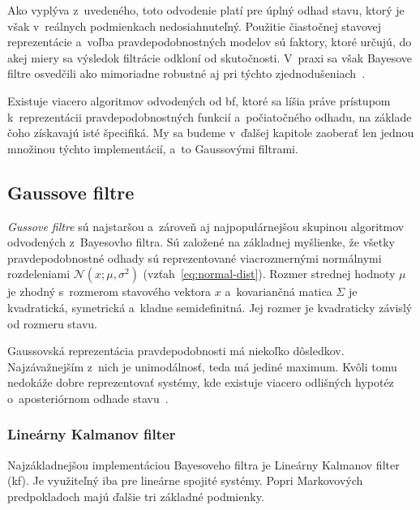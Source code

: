     Ako vyplýva z~uvedeného, toto odvodenie platí pre úplný odhad stavu, ktorý je však v~reálnych podmienkach nedosiahnuteľný. Použitie čiastočnej stavovej reprezentácie a~voľba pravdepodobnostných modelov sú faktory, ktoré určujú, do akej miery sa výsledok filtrácie odkloní od skutočnosti. V~praxi sa však Bayesove filtre osvedčili ako mimoriadne robustné aj pri týchto zjednodušeniach~\cite{thrunProbabilisticRobotics2005}.

    Existuje viacero algoritmov odvodených od \acrshort{bf}, ktoré sa líšia práve prístupom k~reprezentácii pravdepodobnostných funkcií a~počiatočného odhadu, na základe čoho získavajú isté špecifiká. My sa budeme v~ďalšej kapitole zaoberať len jednou množinou týchto implementácií, a~to Gaussovými filtrami.

  \subsection{Gaussove filtre}

    \emph{Gussove filtre} sú najstaršou a~zároveň aj najpopulárnejšou skupinou algoritmov odvodených z~Bayesovho filtra. Sú založené na základnej myšlienke, že všetky pravdepodobnostné odhady sú reprezentované viacrozmernými normálnymi rozdeleniami $\mathcal{N}(x; \mu, \sigma^2)$ (vzťah~\ref{eq:normal-dist}). Rozmer strednej hodnoty $\mu$ je zhodný s~rozmerom stavového vektora $x$ a~kovariančná matica $\Sigma$ je kvadratická, symetrická a~kladne semidefinitná. Jej rozmer je kvadraticky závislý od rozmeru stavu.
    
    Gaussovská reprezentácia pravdepodobnosti má niekoľko dôsledkov. Najzávažnejším z~nich je unimodálnosť, teda má jediné maximum. Kvôli tomu nedokáže dobre reprezentovať systémy, kde existuje viacero odlišných hypotéz o~aposteriórnom odhade stavu~\cite{thrunProbabilisticRobotics2005}.

    \subsubsection{Lineárny Kalmanov filter}

      Najzákladnejšou implementáciou Bayesoveho filtra je Lineárny Kalmanov filter (\acrshort{kf}). Je využiteľný iba pre lineárne spojité systémy. Popri Markovových predpokladoch majú ďalšie tri základné podmienky.

